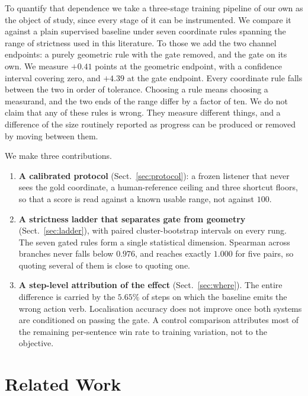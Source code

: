 \documentclass[runningheads,a4paper]{llncs}
\begin{document}
To quantify that dependence we take a three-stage training pipeline of our own as the object of
study, since every stage of it can be instrumented. We compare it against a plain supervised
baseline under seven coordinate rules spanning the range of strictness used in this literature. To
those we add the two channel endpoints: a purely geometric rule with the gate removed, and the
gate on its own. We measure $+0.41$ points at the geometric endpoint, with a confidence
interval covering zero, and $+4.39$ at the gate endpoint. Every coordinate rule falls
between the two in order of tolerance. Choosing a rule means choosing a measurand, and
the two ends of the range differ by a factor of ten. We do not claim that any of these rules is
wrong. They measure different things, and a difference of the size routinely reported as progress
can be produced or removed by moving between them.

We make three contributions.

\begin{enumerate}
\item \textbf{A calibrated protocol} (Sect.~\ref{sec:protocol}): a frozen listener that never
sees the gold coordinate, a human-reference ceiling and three shortcut floors, so that a score is
read against a known usable range, not against $100$.

\item \textbf{A strictness ladder that separates gate from geometry} (Sect.~\ref{sec:ladder}), with
paired cluster-bootstrap intervals on every rung. The seven gated rules form a single statistical dimension. Spearman across branches never falls
below $0.976$, and reaches exactly $1.000$ for five pairs, so quoting several of them is close to
quoting one.

\item \textbf{A step-level attribution of the effect} (Sect.~\ref{sec:where}). The entire
difference is carried by the $5.65\%$ of steps on which the baseline emits the wrong action verb.
Localisation accuracy does not improve once both systems are conditioned on passing the gate. A
control comparison attributes most of the remaining per-sentence win rate to training variation,
not to the objective.
\end{enumerate}

\section{Related Work}
\label{sec:related}
\end{document}
